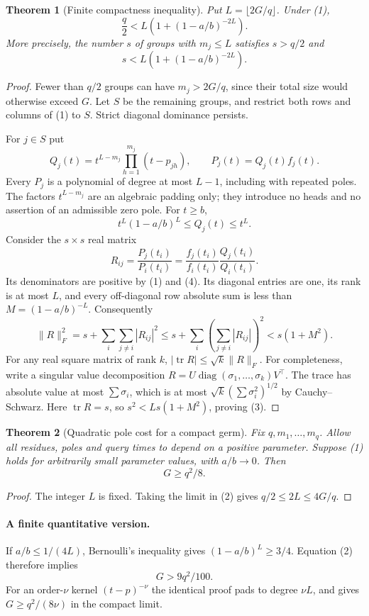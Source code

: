 \documentclass[11pt]{article}
\newtheorem{theorem}{Theorem}
\begin{document}
\begin{theorem}[Finite compactness inequality]
Put $L=\lfloor 2G/q\rfloor$. Under (1),
\[
 \frac q2<L\left(1+(1-a/b)^{-2L}\right).
 \tag{2}
\]
More precisely, the number $s$ of groups with $m_j\leq L$ satisfies
$s>q/2$ and
\[
 s<L\left(1+(1-a/b)^{-2L}\right).
 \tag{3}
\]
\end{theorem}
\begin{proof}
Fewer than $q/2$ groups can have $m_j>2G/q$, since their total size
would otherwise exceed $G$. Let $S$ be the remaining groups, and restrict
both rows and columns of (1) to $S$. Strict diagonal dominance persists.

For $j\in S$ put
\[
 Q_j(t)=t^{L-m_j}\prod_{h=1}^{m_j}(t-p_{jh}),
 \qquad P_j(t)=Q_j(t)f_j(t).
\]
Every $P_j$ is a polynomial of degree at most $L-1$, including with
repeated poles. The factors $t^{L-m_j}$ are an algebraic padding only;
they introduce no heads and no assertion of an admissible zero pole.
For $t\geq b$,
\[
 t^L(1-a/b)^L\leq Q_j(t)\leq t^L.
 \tag{4}
\]
Consider the $s\times s$ real matrix
\[
 R_{ij}=\frac{P_j(t_i)}{P_i(t_i)}
 =\frac{f_j(t_i)}{f_i(t_i)}\frac{Q_j(t_i)}{Q_i(t_i)}.
\]
Its denominators are positive by (1) and (4). Its diagonal entries are
one, its rank is at most $L$, and every off-diagonal row absolute sum
is less than $M=(1-a/b)^{-L}$. Consequently
\[
 \|R\|_F^2
 =s+\sum_i\sum_{j\ne i}|R_{ij}|^2
 \leq s+\sum_i\left(\sum_{j\ne i}|R_{ij}|\right)^2
 <s(1+M^2).
\]
For any real square matrix of rank $k$,
$|\operatorname{tr}R|\leq\sqrt{k}\|R\|_F$.
For completeness, write a singular value decomposition
$R=U\operatorname{diag}(\sigma_1,\ldots,\sigma_k)V^\top$.
The trace has absolute value at most $\sum\sigma_i$, which is at most
$\sqrt{k}(\sum\sigma_i^2)^{1/2}$ by Cauchy--Schwarz.
Here $\operatorname{tr}R=s$, so $s^2<Ls(1+M^2)$, proving (3).
\end{proof}

\begin{theorem}[Quadratic pole cost for a compact germ]
Fix $q,m_1,\ldots,m_q$. Allow all residues, poles and query times to
depend on a positive parameter. Suppose (1) holds for arbitrarily small
parameter values, with $a/b\to0$. Then
\[
 G\geq q^2/8.
 \tag{5}
\]
\end{theorem}
\begin{proof}
The integer $L$ is fixed. Taking the limit in (2) gives
$q/2\leq2L\leq4G/q$.
\end{proof}

\paragraph{A finite quantitative version.}
If $a/b\leq1/(4L)$, Bernoulli's inequality gives
$(1-a/b)^L\geq3/4$. Equation (2) therefore implies
\[
 G>9q^2/100.
\]
For an order-$\nu$ kernel $(t-p)^{-\nu}$ the identical proof pads to
degree $\nu L$, and gives $G\geq q^2/(8\nu)$ in the compact limit.
\end{document}
